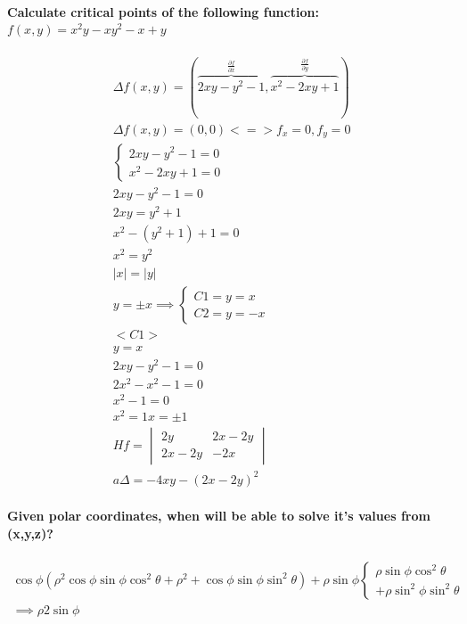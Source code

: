 \documentclass[11pt,fleqn]{book} %
\begin{document}
\paragraph*{Calculate critical points of the following function: $f(x,y) = x^2 y - xy^2 - x+y$}

\begin{gather}
    \Delta f(x,y) = (\overbrace{2xy-y^2-1}^{\frac{\partial f}{\partial x}}, \overbrace{x^2-2xy+1}^{\frac{\partial f}{\partial y}})\\
    \Delta f(x,y) = (0,0) <=> f_x = 0, f_y = 0\\
    \begin{cases}
        2xy-y^2-1=0\\
        x^2-2xy+1=0
    \end{cases}\\
    2xy-y^2-1=0\\
    2xy = y^2 + 1\\
    x^2 - (y^2 + 1) + 1 = 0 \\
    x^2 = y^2 \\
    |x| = |y|\\
    y = \pm x \implies
    \begin{cases}
        C1 = y = x \\
        C2 = y = -x
    \end{cases}\\
    <C1>\\
    y = x\\
    2xy - y^2 -1 = 0\\
    2x^2 - x^2 -1 = 0 \\
    x^2 - 1 = 0\\
    x ^2 = 1
    x = \pm 1\\
    Hf = \begin{vmatrix}
        2y & 2x-2y \\
        2x - 2y & -2x
    \end{vmatrix}\\a
    \Delta = -4xy - (2x - 2y)^2
\end{gather}

\paragraph{Given polar coordinates, when will be able to solve it's values from (x,y,z)?}

\begin{gather}
    \cos \phi ( \rho^2 \cos \phi \sin \phi \cos^2 
    \theta + \rho^2 + \cos \phi \sin \phi \sin^2 
    \theta ) + \rho \sin \phi 
    \begin{cases}
        \rho \sin \phi \cos^2 \theta \\
        + \rho \sin^2 \phi \sin^2 \theta
    \end{cases}\\
    \implies \rho 2 \sin \phi
\end{gather}
\end{document}
